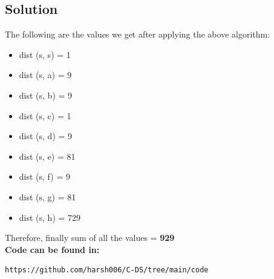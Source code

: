 \documentclass[journal,12pt,twocolumn]{IEEEtran}
\begin{document}
\subsection{\textbf{Solution}}
The following are the values we get after applying the above algorithm:\\
\begin{itemize}
\item dist (s, s) = 1\\
\item dist (s, a) = 9\\
\item dist (s, b) = 9\\
\item dist (s, c) = 1\\
\item dist (s, d) = 9\\
\item dist (s, e) = 81\\
\item dist (s, f) = 9\\
\item dist (s, g) = 81\\
\item dist (s, h) = 729\\
\end{itemize}
Therefore, finally sum of all the values = \textbf{929}\\
\textbf{Code can be found in:}
\begin{lstlisting}
https://github.com/harsh006/C-DS/tree/main/code
\end{lstlisting}
\end{document}
